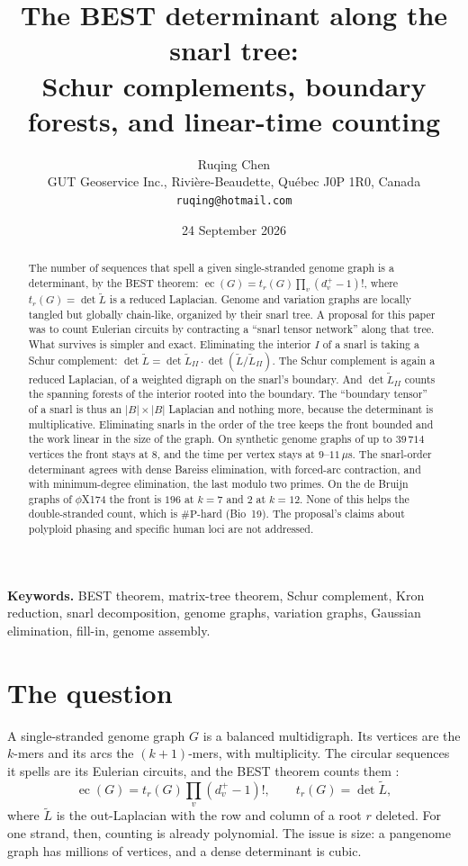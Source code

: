 \documentclass[11pt]{article}
\title{\bfseries The BEST determinant along the snarl tree:\\
Schur complements, boundary forests, and linear-time counting}
\author{Ruqing Chen\\[2pt]
\normalsize GUT Geoservice Inc., Rivi\`ere-Beaudette, Qu\'ebec J0P 1R0, Canada\\
\normalsize\texttt{ruqing@hotmail.com}}
\date{24 September 2026}
\theoremstyle{plain}
\theoremstyle{definition}
\theoremstyle{remark}
\newcommand{\sP}{\#\mathrm{P}}
\newcommand{\Lt}{\widetilde L}
\newcommand{\ec}{\operatorname{ec}}
\begin{document}
\maketitle

\begin{abstract}
\noindent
The number of sequences that spell a given single-stranded genome graph is a determinant, by the BEST
theorem: $\ec(G)=t_r(G)\prod_v(d^+_v-1)!$, where $t_r(G)=\det\Lt$ is a reduced Laplacian. Genome and
variation graphs are locally tangled but globally chain-like, organized by their snarl tree. A proposal
for this paper was to count Eulerian circuits by contracting a ``snarl tensor network'' along that tree.
What survives is simpler and exact. Eliminating the interior $I$ of a snarl is taking a Schur complement:
$\det\Lt=\det\Lt_{II}\cdot\det(\Lt/\Lt_{II})$. The Schur complement is again a reduced Laplacian, of a
weighted digraph on the snarl's boundary. And $\det\Lt_{II}$ counts the spanning forests of the interior
rooted into the boundary. The ``boundary tensor'' of a snarl is thus an $|B|\times|B|$ Laplacian and
nothing more, because the determinant is multiplicative. Eliminating snarls in the order of the tree
keeps the front bounded and the work linear in the size of the graph. On synthetic genome graphs of up to
$39\,714$ vertices the front stays at $8$, and the time per vertex stays at $9$--$11\,\mu$s. The
snarl-order determinant agrees with dense Bareiss elimination, with forced-arc contraction, and with
minimum-degree elimination, the last modulo two primes. On the de Bruijn graphs of $\phi$X174 the front
is $196$ at $k=7$ and $2$ at $k=12$. None of this helps the double-stranded count, which is
$\sP$-hard (Bio~19). The proposal's claims about polyploid phasing and specific human loci are not
addressed.
\end{abstract}

\medskip
\noindent\textbf{Keywords.} BEST theorem, matrix-tree theorem, Schur complement, Kron reduction,
snarl decomposition, genome graphs, variation graphs, Gaussian elimination, fill-in, genome assembly.

\section{The question}\label{sec:q}

A single-stranded genome graph $G$ is a balanced multidigraph. Its vertices are the $k$-mers and its arcs
the $(k+1)$-mers, with multiplicity. The circular sequences it spells are its Eulerian circuits, and the
BEST theorem counts them \cite{BEST}:
\[
\ec(G)=t_r(G)\prod_v(d^+_v-1)!,\qquad t_r(G)=\det\Lt,
\]
where $\Lt$ is the out-Laplacian with the row and column of a root $r$ deleted. For one strand, then,
counting is already polynomial. The issue is size: a pangenome graph has millions of vertices, and a
dense determinant is cubic.
\end{document}
